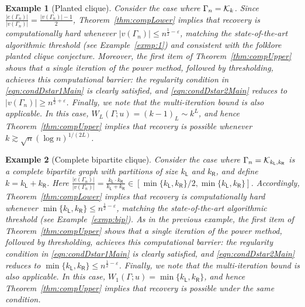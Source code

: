 \documentclass[12pt]{article}
\newtheorem{example}{Example}
\newcommand{\calK}{{\cal K}}
\newcommand{\pp}[1]{\left[#1\right]}
\newcommand{\s}[1]{\mathsf{#1}}
\begin{document}
\begin{example}[Planted clique]
Consider the case where $\Gamma_n = \calK_k$. Since $\frac{|e(\Gamma_n)|}{|v(\Gamma_n)|} = \frac{|v(\Gamma_n)| - 1}{2}$, Theorem~\ref{thm:compLower} implies that recovery is computationally hard whenever $|v(\Gamma_n)| \leq n^{\frac{1}{2} - \varepsilon}$, matching the state-of-the-art algorithmic threshold (see Example~\ref{exmp:1}) and consistent with the folklore planted clique conjecture. Moreover, the first item of Theorem~\ref{thm:compUpper} shows that a single iteration of the power method, followed by thresholding, achieves this computational barrier: the regularity condition in \eqref{eqn:condDstar1Main} is clearly satisfied, and \eqref{eqn:condDstar2Main} reduces to $|v(\Gamma_n)| \geq n^{\frac{1}{2} + \varepsilon}$. Finally, we note that the multi-iteration bound is also applicable. In this case, $W_L(\Gamma;u)=(k-1)_{L}\sim k^L$, and hence Theorem~\ref{thm:compUpper} implies that recovery is possible whenever $k\gtrsim \sqrt n(\log n)^{1/(2L)}$.
\end{example}

\begin{example}[Complete bipartite clique]
Consider the case where $\Gamma_n=\calK_{k_{\s{L}},k_{\s{R}}}$ is a complete bipartite
graph with partitions of size $k_{\s{L}}$ and $k_{\s{R}}$, and define $k=k_{\s{L}}+k_{\s{R}}$. Here $\frac{|e(\Gamma_n)|}{|v(\Gamma_n)|} = \frac{k_{\s{L}}\cdot k_{\s{R}}}{k_{\s{L}}+k_{\s{R}}}\in\pp{\min\{k_{\s{L}},k_{\s{R}}\}/2,\min\{k_{\s{L}},k_{\s{R}}\}}$. Accordingly, Theorem~\ref{thm:compLower} implies that recovery is computationally hard whenever $\min\{k_{\s{L}},k_{\s{R}}\}\leq n^{\frac{1}{2}-\varepsilon}$, matching the state-of-the-art algorithmic threshold (see Example~\ref{exmp:bip}). As in the previous example, the first item of Theorem~\ref{thm:compUpper} shows that a single iteration of the power method, followed by thresholding, achieves this computational barrier: the regularity condition in \eqref{eqn:condDstar1Main} is clearly satisfied, and \eqref{eqn:condDstar2Main} reduces to $\min\{k_{\s{L}},k_{\s{R}}\}\leq n^{\frac{1}{2}-\varepsilon}$. Finally, we note that the multi-iteration bound is also applicable. In this case, $W_1(\Gamma;u)=\min\{k_{\s{L}},k_{\s{R}}\}$, and hence Theorem~\ref{thm:compUpper} implies that recovery is possible under the same condition.
\end{example}
\end{document}
